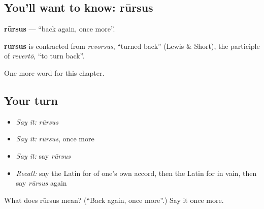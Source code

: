 \subsection*{You'll want to know: rūrsus}
\textbf{rūrsus} — \textquotedblleft{}back again, once more\textquotedblright{}.

\begin{cousinweb}
\textbf{rūrsus} is contracted from \emph{revorsus}, \textquotedblleft{}turned back\textquotedblright{} (Lewis \& Short), the participle of \emph{revertō}, \textquotedblleft{}to turn back\textquotedblright{}.
\end{cousinweb}

\begin{grammarlens}[title={What you've built}]
One more word for this chapter.
\end{grammarlens}

\subsection*{Your turn}
\begin{itemize}
\raggedright
  \item \emph{Say it:} \emph{rūrsus}
  \item \emph{Say it:} \emph{rūrsus}, once more
  \item \emph{Say it:} say \emph{rūrsus}
  \item \emph{Recall:} say the Latin for of one's own accord, then the Latin for in vain, then say \emph{rūrsus} again
\end{itemize}

\begin{tcolorbox}[breakable,colback=teal!4,colframe=teal!35!black,title={Before you move on}]
What does rūrsus mean? (\textquotedblleft{}Back again, once more\textquotedblright{}.) Say it once more.
\end{tcolorbox}
